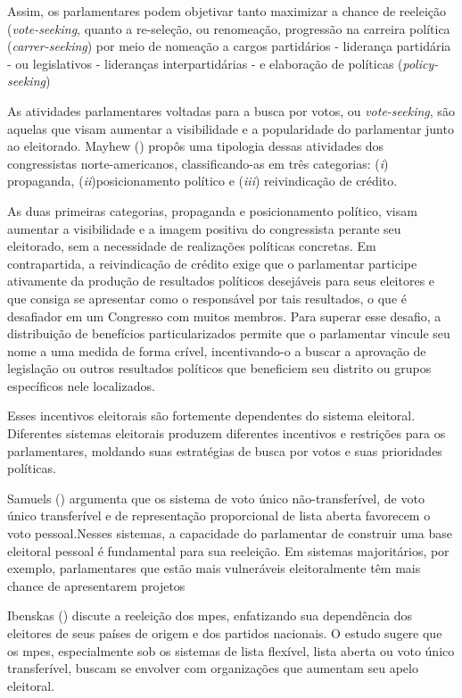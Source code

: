 Assim, os parlamentares podem objetivar tanto maximizar a chance de reeleição (\textit{vote-seeking}, quanto a re-seleção, ou renomeação, progressão na carreira política (\textit{carrer-seeking}) por meio de nomeação a cargos partidários - liderança partidária - ou legislativos - lideranças interpartidárias - \cite{strom1997rules} e elaboração de políticas (\textit{policy-seeking}) \cite{muller1999}

As atividades parlamentares voltadas para a busca por votos, ou \textit{vote-seeking}, são aquelas que visam aumentar a visibilidade e a popularidade do parlamentar junto ao eleitorado. Mayhew (\citeyear{mayhew2004congress}) propôs uma tipologia dessas atividades dos congressistas norte-americanos, classificando-as em três categorias: (\textit{i}) propaganda, (\textit{ii})posicionamento político e (\textit{iii}) reivindicação de crédito. 

As duas primeiras categorias, propaganda e posicionamento político, visam aumentar a visibilidade e a imagem positiva do congressista perante seu eleitorado, sem a necessidade de realizações políticas concretas. Em contrapartida, a reivindicação de crédito exige que o parlamentar participe ativamente da produção de resultados políticos desejáveis para seus eleitores e que consiga se apresentar como o responsável por tais resultados, o que é desafiador em um Congresso com muitos membros. Para superar esse desafio, a distribuição de benefícios particularizados permite que o parlamentar vincule seu nome a uma medida de forma crível, incentivando-o a buscar a aprovação de legislação ou outros resultados políticos que beneficiem seu distrito ou grupos específicos nele localizados.

Esses incentivos eleitorais são fortemente dependentes do sistema eleitoral. Diferentes sistemas eleitorais produzem diferentes incentivos e restrições para os parlamentares, moldando suas estratégias de busca por votos e suas prioridades políticas. 

Samuels (\citeyear{samuels1997determinantes}) argumenta que os sistema de voto único não-transferível, de voto único transferível e de representação proporcional de lista aberta favorecem o voto pessoal.Nesses sistemas, a capacidade do parlamentar de construir uma base eleitoral pessoal é fundamental para sua reeleição. Em sistemas majoritários, por exemplo, parlamentares que estão mais vulneráveis eleitoralmente têm mais chance de apresentarem projetos \cite{bowler2010private}

Ibenskas (\citeyear{Ibenskas2021}) discute a reeleição dos \acrshort{mpe}s, enfatizando sua dependência dos eleitores de seus países de origem e dos partidos nacionais. O estudo sugere que os \acrshort{mpe}s, especialmente sob os sistemas de lista flexível, lista aberta ou voto único transferível, buscam se envolver com organizações que aumentam seu apelo eleitoral.

